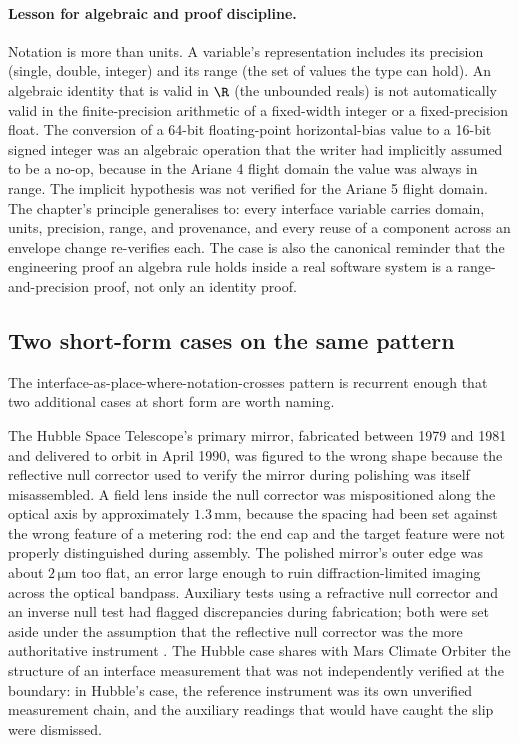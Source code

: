 \paragraph{Lesson for algebraic and proof discipline.}
Notation is more than units. A variable's representation includes
its precision (single, double, integer) and its range (the set of
values the type can hold). An algebraic identity that is valid in
$\R$ (the unbounded reals) is not automatically valid in the
finite-precision arithmetic of a fixed-width integer or a
fixed-precision float. The conversion of a 64-bit floating-point
horizontal-bias value to a 16-bit signed integer was an algebraic
operation that the writer had implicitly assumed to be a no-op,
because in the Ariane 4 flight domain the value was always in range.
The implicit hypothesis was not verified for the Ariane 5 flight
domain. The chapter's principle generalises to: every interface
variable carries domain, units, precision, range, and provenance,
and every reuse of a component across an envelope change re-verifies
each. The case is also the canonical reminder that the engineering
proof an algebra rule holds inside a real software system is a
range-and-precision proof, not only an identity proof.

\subsection{Two short-form cases on the same pattern}

The interface-as-place-where-notation-crosses pattern is recurrent
enough that two additional cases at short form are worth naming.

The Hubble Space Telescope's primary mirror, fabricated between 1979
and 1981 and delivered to orbit in April 1990, was figured to the
wrong shape because the reflective null corrector used to verify the
mirror during polishing was itself misassembled. A field lens inside
the null corrector was mispositioned along the optical axis by
approximately $1.3 \,\si{\milli\meter}$, because the spacing had
been set against the wrong feature of a metering rod: the end cap
and the target feature were not properly distinguished during
assembly. The polished mirror's outer edge was about $2 \,\si{\micro
\meter}$ too flat, an error large enough to ruin diffraction-limited
imaging across the optical bandpass. Auxiliary tests using a
refractive null corrector and an inverse null test had flagged
discrepancies during fabrication; both were set aside under the
assumption that the reflective null corrector was the more
authoritative instrument \cite{acc:nasa-hubble-optical-systems-1990}.
The Hubble case shares with Mars Climate Orbiter the structure of an
interface measurement that was not independently verified at the
boundary: in Hubble's case, the reference instrument was its own
unverified measurement chain, and the auxiliary readings that would
have caught the slip were dismissed.

